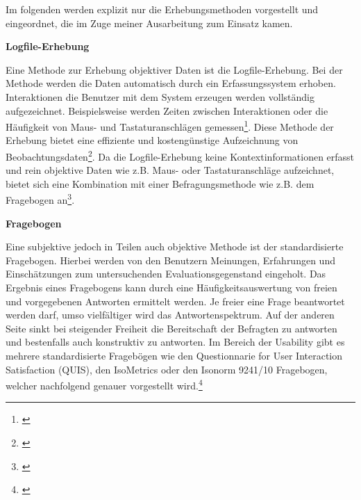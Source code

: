 Im folgenden werden explizit nur die Erhebungsmethoden vorgestellt und eingeordnet, die im Zuge meiner Ausarbeitung zum Einsatz kamen.

\pagebreak
\textbf{Logfile-Erhebung}

Eine Methode zur Erhebung objektiver Daten ist die Logfile-Erhebung. Bei der Methode werden die Daten automatisch durch ein Erfassungssystem erhoben. Interaktionen die Benutzer mit dem System erzeugen werden vollständig aufgezeichnet. Beispielsweise werden Zeiten zwischen Interaktionen oder die Häufigkeit von Maus- und Tastaturanschlägen gemessen\footnote{\cite[vgl.][63]{Hegner2003}}. Diese Methode der Erhebung bietet eine effiziente und kostengünstige Aufzeichnung von Beobachtungsdaten\footnote{\cite[vgl.][Kap. 65.3]{Baur2014}}. Da die Logfile-Erhebung keine Kontextinformationen erfasst und rein objektive Daten wie z.B. Maus- oder Tastaturanschläge aufzeichnet, bietet sich eine Kombination mit einer Befragungsmethode wie z.B. dem Fragebogen an\footnote{\cite[vgl.][17\psq]{Hegner2003}}.

\textbf{Fragebogen}

Eine subjektive jedoch in Teilen auch objektive Methode ist der standardisierte Fragebogen. Hierbei werden von den Benutzern Meinungen, Erfahrungen und Einschätzungen zum untersuchenden Evaluationsgegenstand eingeholt. Das Ergebnis eines Fragebogens kann durch eine Häufigkeitsauswertung von freien und vorgegebenen Antworten ermittelt werden. Je freier eine Frage beantwortet werden darf, umso vielfältiger wird das Antwortenspektrum. Auf der anderen Seite sinkt bei steigender Freiheit die Bereitschaft der Befragten zu antworten und bestenfalls auch konstruktiv zu antworten. Im Bereich der Usability gibt es mehrere standardisierte Fragebögen wie den Questionnarie for User Interaction Satisfaction (QUIS), den IsoMetrics oder den Isonorm 9241/10 Fragebogen, welcher nachfolgend genauer vorgestellt wird.\footnote{\cite[vgl.][Kap. 4.5.1.1]{Hegner2003}}

